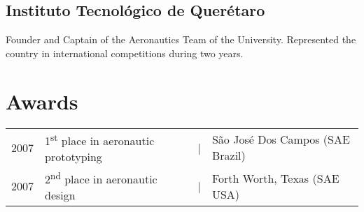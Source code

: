 \documentclass[a4paper]{mario01}
\begin{document}
\begin{minipage}[t]{0.7\textwidth}
		\sectionspace %
		
		\subsection{Instituto Tecnol\'{o}gico de Quer\'{e}taro}
		Founder and Captain of the Aeronautics Team of the University. Represented the country in international competitions during two years.
		
		\sectionspace %
	\section{Awards} 
		\begin{tabular}{rlcl}
			2007 & 1\textsuperscript{st} place in aeronautic prototyping & | & S\~{a}o Jos\'{e} Dos Campos (SAE Brazil)\\
			2007 & 2\textsuperscript{nd} place in aeronautic design & | & Forth Worth, Texas (SAE USA)
		\end{tabular}
	
		\sectionspace %
		\sectionspace %

\end{minipage}
\end{document}
